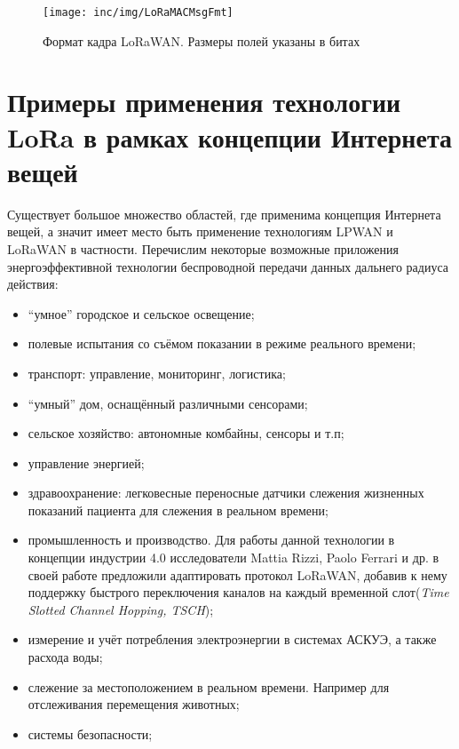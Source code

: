 \begin{figure}[!h]
  \centering
  \texttt{[image: inc/img/LoRaMACMsgFmt]}
  \caption{Формат кадра LoRaWAN. Размеры полей указаны в битах\cite{augustin2016}}
  \label{fig:macframe}
\end{figure}



\section{Примеры применения технологии LoRa в рамках концепции Интернета вещей}

Существует большое множество областей, где применима концепция Интернета вещей, а значит имеет место быть применение технологиям LPWAN и LoRaWAN в частности.
Перечислим некоторые возможные приложения энергоэффективной технологии беспроводной передачи данных дальнего радиуса действия:
\begin{itemize}
 \item ``умное'' городское и сельское освещение;
 \item полевые испытания со съёмом показании в режиме реального времени;
 \item транспорт: управление, мониторинг, логистика;
 \item ``умный'' дом, оснащённый различными сенсорами;
 \item сельское хозяйство: автономные комбайны, сенсоры и т.п;
 \item управление энергией;
 \item здравоохранение: легковесные переносные датчики слежения жизненных показаний пациента для слежения в реальном времени;
 \item промышленность и производство. Для работы данной технологии в концепции индустрии 4.0 исследователи Mattia Rizzi, Paolo Ferrari и др. в своей работе\cite{Rizzi2017} предложили адаптировать протокол LoRaWAN, добавив к нему поддержку быстрого переключения каналов на каждый временной слот(\textit{Time Slotted Channel Hopping, TSCH});
 \item измерение и учёт потребления электроэнергии в системах АСКУЭ, а также расхода воды;
 \item слежение за местоположением в реальном времени. Например для отслеживания перемещения животных; 
 \item системы безопасности; 
\end{itemize}


